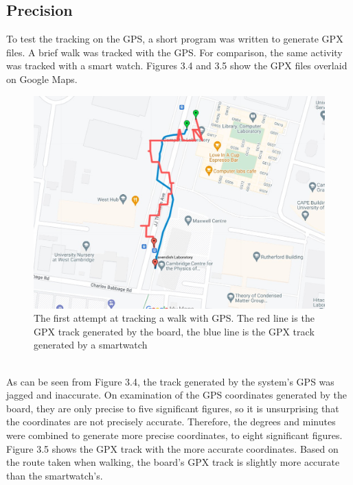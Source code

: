 \documentclass[12pt,a4paper]{report}
\begin{document}
\subsection{Precision}
To test the tracking on the GPS, a short program was written to generate GPX files. A brief walk was tracked with the GPS. For comparison, the same activity was tracked with a smart watch. Figures 3.4 and 3.5 show the GPX files overlaid on Google Maps. \\
\begin{figure}[h]
\begin{center}
\includegraphics[scale=0.4]{gps1.jpg}
\end{center}
\caption{The first attempt at tracking a walk with GPS. The red line is the GPX track generated by the board, the blue line is the GPX track generated by a smartwatch \cite{googlemapsgeneral}}
\end{figure}\\ 
As can be seen from Figure 3.4, the track generated by the system's GPS was jagged and inaccurate. On examination of the GPS coordinates generated by the board, they are only precise to five significant figures, so it is unsurprising that the coordinates are not precisely accurate. Therefore, the degrees and minutes were combined to generate more precise coordinates, to eight significant figures. Figure 3.5 shows the GPX track with the more accurate coordinates. Based on the route taken when walking, the board's GPX track is slightly more accurate than the smartwatch's. 
\end{document}
